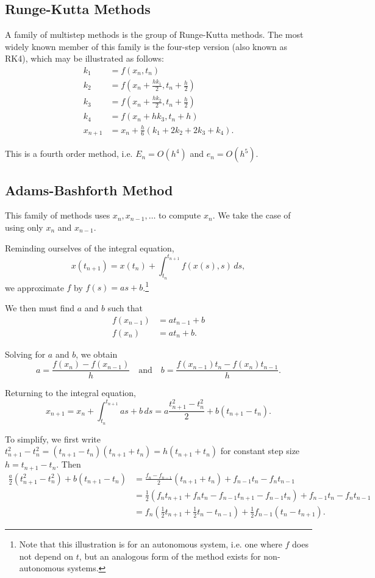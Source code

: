 \subsection{Runge-Kutta Methods}

A family of multistep methods is the group of Runge-Kutta methods. The most widely known member of this family is the four-step version (also known as RK4), which may be illustrated as follows:
\begin{align*}
	k_1 &= f(x_n, t_n) \\
	k_2 &= f(x_n + \frac{hk_1}{2}, t_n + \frac{h}{2}) \\
	k_3 &= f(x_n + \frac{hk_2}{2}, t_n + \frac{h}{2}) \\
	k_4 &= f(x_n + hk_3, t_n + h) \\
	x_{n+1} &= x_n + \frac{h}{6} (k_1 + 2k_2 + 2k_3 + k_4).
\end{align*}

This is a fourth order method, i.e. $E_n = O(h^4)$ and $e_n = O(h^5)$.

\subsection{Adams-Bashforth Method}

This family of methods uses $x_n, x_{n-1}, \dots$ to compute $x_n$. We take the case of using only $x_n$ and $x_{n-1}$. 

Reminding ourselves of the integral equation,
\[
x(t_{n+1}) = x(t_n) + \int_{t_n}^{t_{n+1}} f(x(s), s) \,ds,
\]
we approximate $f$ by $f(s) = as + b$.\footnote{Note that this illustration is for an autonomous system, i.e. one where $f$ does not depend on $t$, but an analogous form of the method exists for non-autonomous systems.}

We then must find $a$ and $b$ such that 
\begin{align*}
	f(x_{n-1}) &= a t_{n-1}+b \\
	f(x_n) &= a t_n + b.
\end{align*}

Solving for $a$ and $b$, we obtain
\[
a = \frac{f(x_n)-f(x_{n-1})}{h} \quad \text{and} \quad b = \frac{f(x_{n-1})t_n - f(x_n)t_{n-1}}{h}.
\]

Returning to the integral equation,
\[
x_{n+1} = x_n + \int_{t_n}^{t_{n+1}} as + b \,ds = a \frac{t_{n+1}^2 - t_n^2}{2} + b(t_{n+1} - t_n).
\]

To simplify, we first write $t_{n+1}^2 - t_n^2 = (t_{n+1} - t_n)(t_{n+1}+t_n) = h (t_{n+1}+t_n)$ for constant step size $h = t_{n+1} - t_n$. Then
\begin{align*}
	\frac{a}{2}(t_{n+1}^2 - t_n^2) + b(t_{n+1} - t_n) &= \frac{f_n - f_{n-1}}{2}(t_{n+1}+t_n) + f_{n-1}t_n - f_n t_{n-1} \\ 
	&= \frac12(f_n t_{n+1} + f_nt_n - f_{n-1}t_{n+1} - f_{n-1}t_n) + f_{n-1}t_n - f_n t_{n-1} \\ 
	&= f_n(\frac12 t_{n+1} + \frac12 t_n - t_{n-1}) + \frac12 f_{n-1}(t_n - t_{n+1}).
\end{align*}

